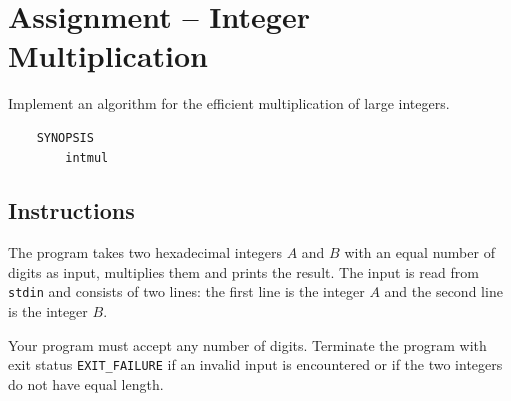 
\usepackage{amsmath}
\usepackage{multicol}
\usepackage{graphicx}



\section*{Assignment -- Integer Multiplication}
Implement an algorithm for the efficient multiplication of large integers.
\begin{verbatim}
    SYNOPSIS
        intmul
\end{verbatim}

\subsection*{Instructions}
The program takes two hexadecimal integers $A$ and $B$ with an equal number of digits as input, multiplies them and prints the result.
The input is read from \texttt{stdin} and consists of two lines:
the first line is the integer $A$ and the second line is the integer $B$.

Your program must accept any number of digits.
Terminate the program with exit status \verb|EXIT_FAILURE|
if an invalid input is encountered
or if the two integers do not have equal length.

